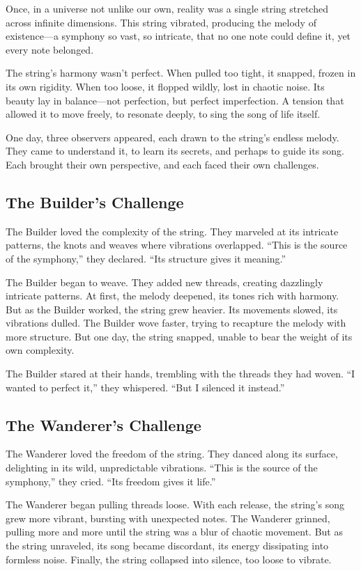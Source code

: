 \documentclass[12pt]{article}
\begin{document}
Once, in a universe not unlike our own, reality was a single string stretched across infinite dimensions. This string vibrated, producing the melody of existence---a symphony so vast, so intricate, that no one note could define it, yet every note belonged.

The string’s harmony wasn’t perfect. When pulled too tight, it snapped, frozen in its own rigidity. When too loose, it flopped wildly, lost in chaotic noise. Its beauty lay in balance---not perfection, but perfect imperfection. A tension that allowed it to move freely, to resonate deeply, to sing the song of life itself.

One day, three observers appeared, each drawn to the string’s endless melody. They came to understand it, to learn its secrets, and perhaps to guide its song. Each brought their own perspective, and each faced their own challenges.

\subsection*{The Builder’s Challenge}
The Builder loved the complexity of the string. They marveled at its intricate patterns, the knots and weaves where vibrations overlapped. “This is the source of the symphony,” they declared. “Its structure gives it meaning.”

The Builder began to weave. They added new threads, creating dazzlingly intricate patterns. At first, the melody deepened, its tones rich with harmony. But as the Builder worked, the string grew heavier. Its movements slowed, its vibrations dulled. The Builder wove faster, trying to recapture the melody with more structure. But one day, the string snapped, unable to bear the weight of its own complexity.

The Builder stared at their hands, trembling with the threads they had woven. “I wanted to perfect it,” they whispered. “But I silenced it instead.”

\subsection*{The Wanderer’s Challenge}
The Wanderer loved the freedom of the string. They danced along its surface, delighting in its wild, unpredictable vibrations. “This is the source of the symphony,” they cried. “Its freedom gives it life.”

The Wanderer began pulling threads loose. With each release, the string’s song grew more vibrant, bursting with unexpected notes. The Wanderer grinned, pulling more and more until the string was a blur of chaotic movement. But as the string unraveled, its song became discordant, its energy dissipating into formless noise. Finally, the string collapsed into silence, too loose to vibrate.
\end{document}
